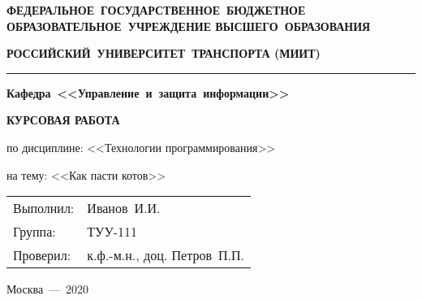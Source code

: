 \begin{titlepage}

    \centering

    {\normalsize \bfseries ФЕДЕРАЛЬНОЕ~ГОСУДАРСТВЕННОЕ~БЮДЖЕТНОЕ ОБРАЗОВАТЕЛЬНОЕ~УЧРЕЖДЕНИЕ ВЫСШЕГО~ОБРАЗОВАНИЯ \par}

    \vspace{1cm}

    {\normalsize \bfseries РОССИЙСКИЙ~УНИВЕРСИТЕТ~ТРАНСПОРТА (МИИТ) \par}

    \vspace{0.5cm}

    \noindent\rule{12cm}{0.4pt}

    \vspace{1cm}

    {\normalsize \bfseries Кафедра~<<Управление~и~защита~информации>> \par}

    \vspace{4cm}


    {\Large \bfseries КУРСОВАЯ РАБОТА \par}
    {\large по дисциплине: <<Технологии программирования>> \par}
    {\large на тему: <<Как пасти котов>> \par}

    \vfill

    \begin{flushright}
        \begin{tabular}{l l}
            {\normalsize Выполнил: } & {\normalsize Иванов~И.И. } \\
            {\normalsize Группа: }   & {\normalsize ТУУ-111 } \\
            {\normalsize Проверил: } & {\normalsize к.ф.-м.н., доц. Петров~П.П. } \\
        \end{tabular}
    \end{flushright}

    \vspace{\fill}

    {\normalsize Москва~---~2020 \par}

\end{titlepage}
